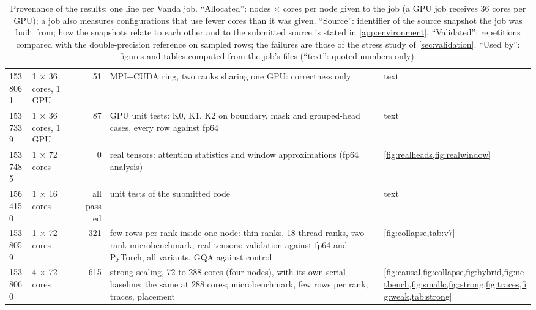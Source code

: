 \begin{table}[!htb]
\begin{tabularx}{\textwidth}{@{}l l l r >{\hsize}Y >{\hsize}Y@{}}
1538061 & 1 $\times$ 36 cores, 1 GPU &  & 51 & MPI+CUDA ring, two ranks sharing one GPU: correctness only & text\\
1537339 & 1 $\times$ 36 cores, 1 GPU &  & 87 & GPU unit tests: K0, K1, K2 on boundary, mask and grouped-head cases, every row against fp64 & text\\
1537485 & 1 $\times$ 72 cores &  & 0 & real tensors: attention statistics and window approximations (fp64 analysis) & \cref{fig:realheads,fig:realwindow}\\
1564150 & 1 $\times$ 16 cores &  & all passed & unit tests of the submitted code & text\\
1538059 & 1 $\times$ 72 cores &  & 321 & few rows per rank inside one node: thin ranks, 18-thread ranks, two-rank microbenchmark; real tensors: validation against fp64 and PyTorch, all variants, GQA against control & \cref{fig:collapse,tab:v7}\\
1538060 & 4 $\times$ 72 cores &  & 615 & strong scaling, 72 to 288 cores (four nodes), with its own serial baseline; the same at 288 cores; microbenchmark, few rows per rank, traces, placement & \cref{fig:causal,fig:collapse,fig:hybrid,fig:netbench,fig:smallc,fig:strong,fig:traces,fig:weak,tab:strong}\\
\bottomrule
\end{tabularx}
\caption{Provenance of the results: one line per Vanda job. ``Allocated'': nodes $\times$ cores per node given to the job (a GPU job receives 36 cores per GPU); a job also measures configurations that use fewer cores than it was given. ``Source'': identifier of the source snapshot the job was built from; how the snapshots relate to each other and to the submitted source is stated in \cref{app:environment}. ``Validated'': repetitions compared with the double-precision reference on sampled rows; the failures are those of the stress study of \cref{sec:validation}. ``Used by'': figures and tables computed from the job's files (``text'': quoted numbers only).}
\label{tab:provenance}
\end{table}
